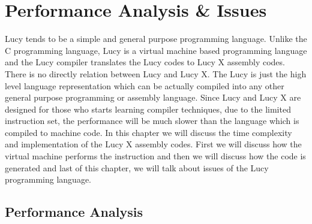 \chapter{Performance Analysis \& Issues}
Lucy tends to be a simple and general purpose programming language. Unlike the C programming language, Lucy is a virtual machine based programming language and the Lucy compiler translates the Lucy codes to Lucy X assembly codes. There is no directly relation between Lucy and Lucy X. The Lucy is just the high level language representation which can be actually compiled into any other general purpose programming or assembly language. Since Lucy and Lucy X are designed for those who starts learning compiler techniques, due to the limited instruction set, the performance will be much slower than the language which is compiled to machine code. In this chapter we will discuss the time complexity and implementation of the Lucy X assembly codes. First we will discuss how the virtual machine performs the instruction and then we will discuss how the code is generated and last of this chapter, we will talk about issues of the Lucy programming language.


\section{Performance Analysis}
